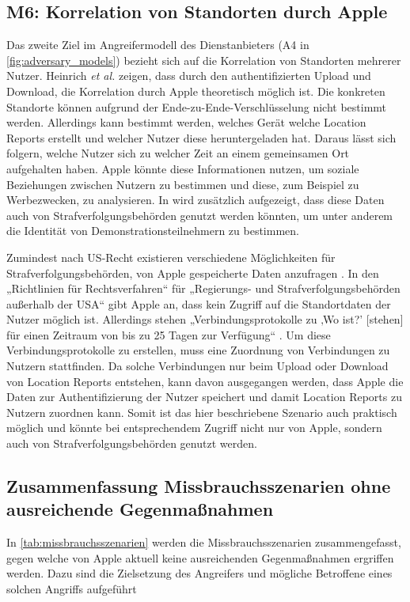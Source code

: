 \subsection[M6]{M6: Korrelation von Standorten durch Apple}
\label{missbrauch:6}

Das zweite Ziel im Angreifermodell des Dienstanbieters (A4 in \autoref{fig:adversary_models}) bezieht sich auf die Korrelation von Standorten mehrerer Nutzer.
Heinrich \textit{et al.} \cite{Heinrich_FindMy} zeigen, dass durch den authentifizierten Upload und Download, die Korrelation durch Apple theoretisch möglich ist.
Die konkreten Standorte können aufgrund der Ende-zu-Ende-Verschlüsselung nicht bestimmt werden.
Allerdings kann bestimmt werden, welches Gerät welche Location Reports erstellt und welcher Nutzer diese heruntergeladen hat.
Daraus lässt sich folgern, welche Nutzer sich zu welcher Zeit an einem gemeinsamen Ort aufgehalten haben.
Apple könnte diese Informationen nutzen, um soziale Beziehungen zwischen Nutzern zu bestimmen und diese, zum Beispiel zu Werbezwecken, zu analysieren.
In \cite{Heinrich_FindMy} wird zusätzlich aufgezeigt, dass diese Daten auch von Strafverfolgungsbehörden genutzt werden könnten, um unter anderem die Identität von Demonstrationsteilnehmern zu bestimmen.

Zumindest nach US-Recht existieren verschiedene Möglichkeiten für Strafverfolgungsbehörden, von Apple gespeicherte Daten anzufragen \cite{Data_Access}.
In den „Richtlinien für Rechtsverfahren“ für „Regierungs- und Strafverfolgungsbehörden außerhalb der USA“ \cite{Apple_FindMy_Data} gibt Apple an, dass kein Zugriff auf die Standortdaten der Nutzer möglich ist.
Allerdings stehen „Verbindungsprotokolle zu ‚Wo ist?’ [stehen] für einen Zeitraum von bis zu 25 Tagen zur Verfügung“ \cite{Apple_FindMy_Data}.
Um diese Verbindungsprotokolle zu erstellen, muss eine Zuordnung von Verbindungen zu Nutzern stattfinden.
Da solche Verbindungen nur beim Upload oder Download von Location Reports entstehen, kann davon ausgegangen werden, dass Apple die Daten zur Authentifizierung der Nutzer speichert und damit Location Reports zu Nutzern zuordnen kann.
Somit ist das hier beschriebene Szenario auch praktisch möglich und könnte bei entsprechendem Zugriff nicht nur von Apple, sondern auch von Strafverfolgungsbehörden genutzt werden.



\subsection{Zusammenfassung Missbrauchsszenarien ohne ausreichende Gegenmaßnahmen}
In \autoref{tab:missbrauchsszenarien} werden die Missbrauchsszenarien zusammengefasst, gegen welche von Apple aktuell keine ausreichenden Gegenmaßnahmen ergriffen werden.
Dazu sind die Zielsetzung des Angreifers und mögliche Betroffene eines solchen Angriffs aufgeführt

